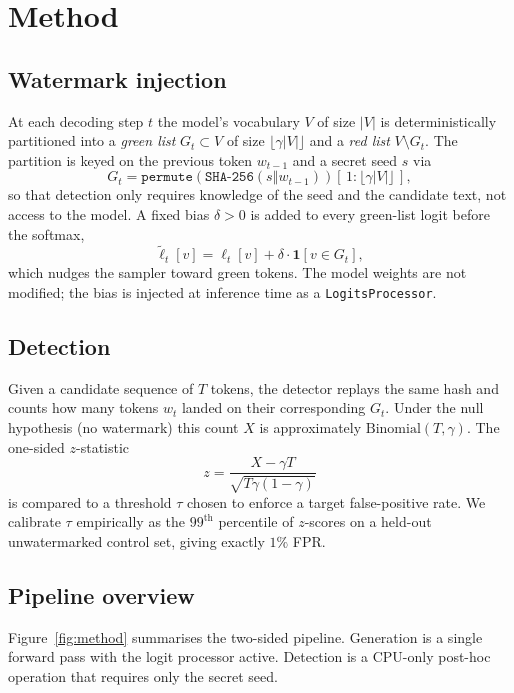 \documentclass[10pt,twocolumn,letterpaper]{article}
\begin{document}
\section{Method}
\label{sec:method}

\subsection{Watermark injection}
At each decoding step $t$ the model's vocabulary $V$ of size $|V|$ is deterministically partitioned into a \emph{green list} $G_t \subset V$ of size $\lfloor\gamma|V|\rfloor$ and a \emph{red list} $V\setminus G_t$. The partition is keyed on the previous token $w_{t-1}$ and a secret seed $s$ via
\begin{equation}
G_t = \texttt{permute}\!\left(\texttt{SHA-256}(s \mathbin\Vert w_{t-1})\right)[\,1{:}\lfloor\gamma|V|\rfloor\,],
\end{equation}
so that detection only requires knowledge of the seed and the candidate text, not access to the model. A fixed bias $\delta>0$ is added to every green-list logit before the softmax,
\begin{equation}
\tilde\ell_t[v] = \ell_t[v] + \delta\cdot\mathbf{1}[v\in G_t],
\end{equation}
which nudges the sampler toward green tokens. The model weights are not modified; the bias is injected at inference time as a \texttt{LogitsProcessor}.

\subsection{Detection}
Given a candidate sequence of $T$ tokens, the detector replays the same hash and counts how many tokens $w_t$ landed on their corresponding $G_t$. Under the null hypothesis (no watermark) this count $X$ is approximately $\text{Binomial}(T,\gamma)$. The one-sided $z$-statistic
\begin{equation}
z = \frac{X - \gamma T}{\sqrt{T\gamma(1-\gamma)}}
\label{eq:zscore}
\end{equation}
is compared to a threshold $\tau$ chosen to enforce a target false-positive rate. We calibrate $\tau$ empirically as the $99^{\text{th}}$ percentile of $z$-scores on a held-out unwatermarked control set, giving exactly $1\%$ FPR.

\subsection{Pipeline overview}
Figure~\ref{fig:method} summarises the two-sided pipeline. Generation is a single forward pass with the logit processor active. Detection is a CPU-only post-hoc operation that requires only the secret seed.
\end{document}
